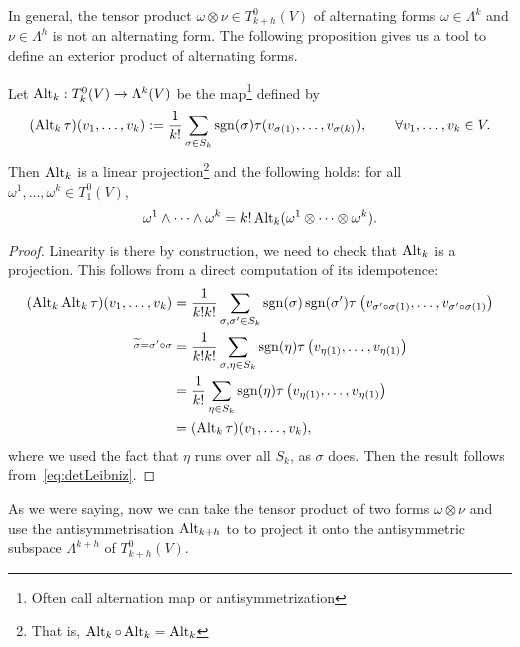 In general, the tensor product $\omega\otimes\nu\in T_{k+h}^0(V)$ of alternating forms $\omega\in\Lambda^k$ and $\nu\in\Lambda^{h}$ is not an alternating form.
The following proposition gives us a tool to define an exterior product of alternating forms.

\begin{proposition}
  Let $\operatorname{Alt}_k: T_k^0(V)\to \Lambda^k(V)$ be the map\footnote{Often call alternation map or antisymmetrization} defined by
  \begin{equation}
    (\operatorname{Alt}_k\tau)(v_1,\ldots,v_k) := \frac1{k!} \sum_{\sigma\in S_k} \operatorname{sgn}(\sigma) \tau(v_{\sigma(1)}, \ldots, v_{\sigma(k)}),
    \qquad \forall v_1,\ldots,v_k \in V.
  \end{equation}
  Then $\operatorname{Alt}_k$ is a linear projection\footnote{That is, $\operatorname{Alt}_k\circ\operatorname{Alt}_k = \operatorname{Alt}_k$} and the following holds:
  for all $\omega^1, \ldots, \omega^k \in T^0_1(V)$,
  \begin{equation}
    \omega^1 \wedge \cdots \wedge \omega^k = k! \operatorname{Alt}_k(\omega^1 \otimes \cdots \otimes \omega^k).
  \end{equation}
\end{proposition}
\begin{proof}
  Linearity is there by construction, we need to check that $\operatorname{Alt}_k$ is a projection.
  This follows from a direct computation of its idempotence:
  \begin{align}
    (\operatorname{Alt}_k \operatorname{Alt}_k \tau)(v_1,\ldots, v_k)
     & = \frac1{k!k!}\sum_{\sigma,\sigma'\in S_k}\operatorname{sgn}(\sigma)\operatorname{sgn}(\sigma') \tau\left(v_{\sigma'\circ\sigma(1)}, \ldots, v_{\sigma'\circ\sigma(1)}\right) \\
    \overset{\widetilde \sigma = \sigma'\circ\sigma}{}
     & =\frac1{k!k!}\sum_{\sigma,\eta\in S_k}\operatorname{sgn}(\eta) \tau\left(v_{\eta(1)}, \ldots, v_{\eta(1)}\right)                                                \\
     & =\frac1{k!}\sum_{\eta\in S_k}\operatorname{sgn}(\eta) \tau\left(v_{\eta(1)}, \ldots, v_{\eta(1)}\right)                                                         \\
     & =(\operatorname{Alt}_k \tau)(v_1,\ldots, v_k),
  \end{align}
  where we used the fact that $\eta$ runs over all $S_k$, as $\sigma$ does.
  Then the result follows from~\eqref{eq:detLeibniz}.
\end{proof}

As we were saying, now we can take the tensor product of two forms $\omega\otimes\nu$ and use the antisymmetrisation $\operatorname{Alt}_{k+h}$ to to project it onto the antisymmetric subspace $\Lambda^{k+h}$ of $T_{k+h}^0(V)$.

